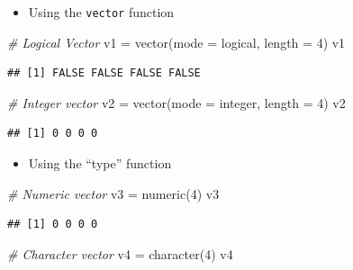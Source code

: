 \documentclass[
]{book}
\newenvironment{Shaded}{\begin{snugshade}}{\end{snugshade}}
\newcommand{\AttributeTok}[1]{\textcolor[rgb]{0.77,0.63,0.00}{#1}}
\newcommand{\CommentTok}[1]{\textcolor[rgb]{0.56,0.35,0.01}{\textit{#1}}}
\newcommand{\DecValTok}[1]{\textcolor[rgb]{0.00,0.00,0.81}{#1}}
\newcommand{\FunctionTok}[1]{\textcolor[rgb]{0.00,0.00,0.00}{#1}}
\newcommand{\NormalTok}[1]{#1}
\newcommand{\OtherTok}[1]{\textcolor[rgb]{0.56,0.35,0.01}{#1}}
\newcommand{\StringTok}[1]{\textcolor[rgb]{0.31,0.60,0.02}{#1}}
\providecommand{\tightlist}{%
  \setlength{\itemsep}{0pt}\setlength{\parskip}{0pt}}
\theoremstyle{definition}
\theoremstyle{definition}
\theoremstyle{definition}
\theoremstyle{definition}
\theoremstyle{remark}
\begin{document}
\begin{itemize}
\tightlist
\item
  Using the \texttt{vector} function
\end{itemize}

\begin{Shaded}
\begin{Highlighting}[]
\CommentTok{\# Logical Vector}
\NormalTok{v1 }\OtherTok{=} \FunctionTok{vector}\NormalTok{(}\AttributeTok{mode =} \StringTok{\textquotesingle{}logical\textquotesingle{}}\NormalTok{, }\AttributeTok{length =} \DecValTok{4}\NormalTok{)}
\NormalTok{v1}
\end{Highlighting}
\end{Shaded}

\begin{verbatim}
## [1] FALSE FALSE FALSE FALSE
\end{verbatim}

\begin{Shaded}
\begin{Highlighting}[]
\CommentTok{\# Integer vector}
\NormalTok{v2 }\OtherTok{=} \FunctionTok{vector}\NormalTok{(}\AttributeTok{mode =} \StringTok{\textquotesingle{}integer\textquotesingle{}}\NormalTok{, }\AttributeTok{length =} \DecValTok{4}\NormalTok{)}
\NormalTok{v2}
\end{Highlighting}
\end{Shaded}

\begin{verbatim}
## [1] 0 0 0 0
\end{verbatim}

\begin{itemize}
\tightlist
\item
  Using the ``type'' function
\end{itemize}

\begin{Shaded}
\begin{Highlighting}[]
\CommentTok{\# Numeric vector}
\NormalTok{v3 }\OtherTok{=} \FunctionTok{numeric}\NormalTok{(}\DecValTok{4}\NormalTok{)}
\NormalTok{v3}
\end{Highlighting}
\end{Shaded}

\begin{verbatim}
## [1] 0 0 0 0
\end{verbatim}

\begin{Shaded}
\begin{Highlighting}[]
\CommentTok{\# Character vector}
\NormalTok{v4 }\OtherTok{=} \FunctionTok{character}\NormalTok{(}\DecValTok{4}\NormalTok{)}
\NormalTok{v4}
\end{Highlighting}
\end{Shaded}
\end{document}
